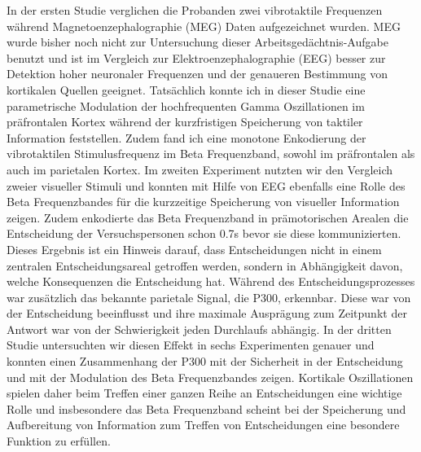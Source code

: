 In der ersten Studie verglichen die Probanden zwei vibrotaktile Frequenzen während Magnetoenzephalographie (MEG) Daten aufgezeichnet wurden. MEG wurde bisher noch nicht zur Untersuchung dieser Arbeitsgedächtnis-Aufgabe benutzt und ist im Vergleich zur Elektroenzephalographie (EEG) besser zur Detektion hoher neuronaler Frequenzen und der genaueren Bestimmung von kortikalen Quellen geeignet. Tatsächlich konnte ich in dieser Studie eine parametrische Modulation der hochfrequenten Gamma Oszillationen im präfrontalen Kortex während der kurzfristigen Speicherung von taktiler Information feststellen. Zudem fand ich eine monotone Enkodierung der vibrotaktilen Stimulusfrequenz im Beta Frequenzband, sowohl im präfrontalen als auch im parietalen Kortex. Im zweiten Experiment nutzten wir den Vergleich zweier visueller Stimuli und konnten mit Hilfe von EEG ebenfalls eine Rolle des Beta Frequenzbandes für die kurzzeitige Speicherung von visueller Information zeigen.  Zudem enkodierte das Beta Frequenzband in prämotorischen Arealen die Entscheidung der Versuchspersonen schon 0.7s bevor sie diese kommunizierten. Dieses Ergebnis ist ein Hinweis darauf, dass Entscheidungen nicht in einem zentralen Entscheidungsareal getroffen werden, sondern in Abhängigkeit davon, welche Konsequenzen die Entscheidung hat. Während des Entscheidungsprozesses war zusätzlich das bekannte parietale Signal, die P300, erkennbar. Diese war von der Entscheidung beeinflusst und ihre maximale Ausprägung zum Zeitpunkt der Antwort war von der Schwierigkeit jeden Durchlaufs abhängig. In der dritten Studie untersuchten wir diesen Effekt in sechs Experimenten genauer und konnten einen Zusammenhang der P300 mit der Sicherheit in der Entscheidung und mit der Modulation des Beta Frequenzbandes zeigen. Kortikale Oszillationen spielen daher beim Treffen einer ganzen Reihe an Entscheidungen eine wichtige Rolle und insbesondere das Beta Frequenzband scheint bei der Speicherung und Aufbereitung von Information zum Treffen von Entscheidungen eine besondere Funktion zu erfüllen.

